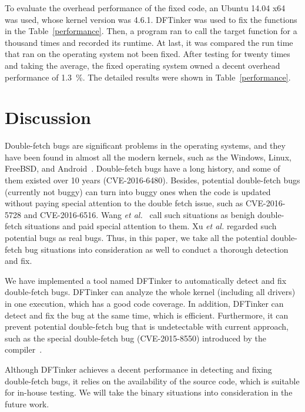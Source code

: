 \documentclass[10pt]{llncs}
\begin{document}
To evaluate the overhead performance of the fixed code, an Ubuntu 14.04 x64 was used, whose kernel version was 4.6.1. DFTinker was used to fix the functions in the Table~\ref{performance}. Then, a program ran to call the target function for a thousand times and recorded its runtime. At last, it was compared the run time that ran on the operating system not been fixed. After testing for twenty times and taking the average, the fixed operating system owned a decent overhead performance of 1.3~\%. The detailed results were shown in Table~\ref{performance}.

\section{Discussion}%
\label{discuss}

Double-fetch bugs are significant problems in the operating systems, and they have been found in almost all the modern kernels, such as the Windows, Linux, FreeBSD, and Android~\cite{wang,precise}. Double-fetch bugs have a long history, and some of them existed over 10 years (CVE-2016-6480). Besides, potential double-fetch bugs (currently not buggy) can turn into buggy ones when the code is updated without paying special attention to the double fetch issue, such as CVE-2016-5728 and CVE-2016-6516. Wang \textit{et al.}~\cite{wang} call such situations as benigh double-fetch situations and paid special attention to them. Xu \textit{et al.}\cite{precise} regarded such potential bugs as real bugs. Thus, in this paper, we take all the potential double-fetch bug situations into consideration as well to conduct a thorough detection and fix.

We have implemented a tool named DFTinker to automatically detect and fix double-fetch bugs. DFTinker can analyze the whole kernel (including all drivers) in one execution, which has a good code coverage. In addition, DFTinker can detect and fix the bug at the same time, which is efficient. Furthermore, it can prevent potential double-fetch bug that is undetectable with current approach, such as the special double-fetch bug (CVE-2015-8550) introduced by the compiler~\cite{wilhelm15tracing}.  

Although DFTinker achieves a decent performance in detecting and fixing double-fetch bugs, it relies on the availability of the source code, which is suitable for in-house testing. We will take the binary situations into consideration in the future work. 

\end{document}
